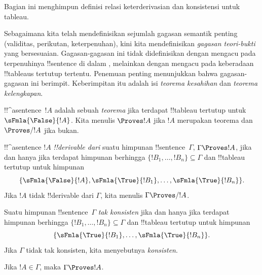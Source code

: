 \documentclass[../../../include/open-logic-section]{subfiles}
\begin{document}
      {}
      {}


\begin{editorial}
Bagian ini menghimpun definisi relasi keterderivasian dan konsistensi
untuk tableau.
\end{editorial}

\begin{explain}
Sebagaimana kita telah mendefinisikan sejumlah gagasan semantik penting
(validitas, perikutan, keterpenuhan), kini kita mendefinisikan
\emph{gagasan teori-bukti} yang bersesuaian. Gagasan-gagasan ini tidak
didefinisikan dengan mengacu pada terpenuhinya !!{sentence} di dalam
, melainkan dengan mengacu pada keberadaan !!{tableau}s
tertutup tertentu. Penemuan penting menunjukkan bahwa gagasan-gagasan
ini berimpit. Keberimpitan itu adalah isi \emph{teorema kesahihan} dan
\emph{teorema kelengkapan}.
\end{explain}


\begin{defn}[Teorema]
!!^a{sentence}~$!A$ adalah sebuah \emph{teorema} jika terdapat
!!{tableau} tertutup untuk~$\sFmla{\False}{!A}$. Kita menulis
$\Proves !A$ jika $!A$ merupakan teorema dan $\Proves/ !A$ jika bukan.
\end{defn}

\begin{defn}[!!^{derivability}]
!!^a{sentence} $!A$ \emph{!!{derivable} dari} suatu himpunan
!!{sentence}~$\Gamma$, $\Gamma \Proves !A$, jika dan hanya jika terdapat
himpunan berhingga $\{!B_1, \dots, !B_n\} \subseteq \Gamma$ dan
!!{tableau} tertutup untuk himpunan
\[
\{
  \sFmla{\False}{!A},
  \sFmla{\True}{!B_1}, \dots,
  \sFmla{\True}{!B_n}
  \}.
\]
Jika $!A$ tidak !!{derivable} dari $\Gamma$, kita menulis
$\Gamma \Proves/ !A$.
\end{defn}

\begin{defn}[Konsistensi]
Suatu himpunan !!{sentence}~$\Gamma$ \emph{tak konsisten} jika dan hanya
jika terdapat himpunan berhingga $\{!B_1, \dots, !B_n\} \subseteq
\Gamma$ dan !!{tableau} tertutup untuk himpunan
\[
\{
  \sFmla{\True}{!B_1}, \dots,
  \sFmla{\True}{!B_n}
  \}.
\]
Jika $\Gamma$ tidak tak konsisten, kita menyebutnya \emph{konsisten}.
\end{defn}

\begin{prop}[Refleksivitas]
Jika $!A \in \Gamma$, maka $\Gamma \Proves !A$.
\end{prop}
\end{document}
